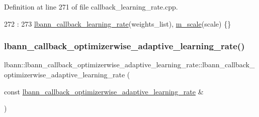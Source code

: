 Definition at line 271 of file callback\+\_\+learning\+\_\+rate.\+cpp.


\begin{DoxyCode}
272                                                          :
273   \hyperlink{classlbann_1_1lbann__callback__learning__rate_a69687cd55f4d09c480e08e18488519fe}{lbann\_callback\_learning\_rate}(weights\_list), 
      \hyperlink{classlbann_1_1lbann__callback__optimizerwise__adaptive__learning__rate_a332beb0eb4464929248f56e1815d4e69}{m\_scale}(scale) \{\}
\end{DoxyCode}
\mbox{\label{classlbann_1_1lbann__callback__optimizerwise__adaptive__learning__rate_acf561f3ca522caa6f9d8e8333e5138cc}} 
\subsubsection{\texorpdfstring{lbann\+\_\+callback\+\_\+optimizerwise\+\_\+adaptive\+\_\+learning\+\_\+rate()}{lbann\_callback\_optimizerwise\_adaptive\_learning\_rate()}\hspace{0.1cm}{\footnotesize\ttfamily [3/3]}}
{\footnotesize\ttfamily lbann\+::lbann\+\_\+callback\+\_\+optimizerwise\+\_\+adaptive\+\_\+learning\+\_\+rate\+::lbann\+\_\+callback\+\_\+optimizerwise\+\_\+adaptive\+\_\+learning\+\_\+rate (\begin{DoxyParamCaption}\item[{const \hyperlink{classlbann_1_1lbann__callback__optimizerwise__adaptive__learning__rate}{lbann\+\_\+callback\+\_\+optimizerwise\+\_\+adaptive\+\_\+learning\+\_\+rate} \&}]{ }\end{DoxyParamCaption})\hspace{0.3cm}{\ttfamily [default]}}



